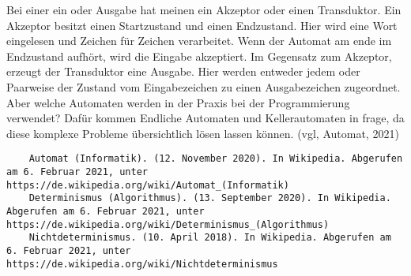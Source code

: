 Bei einer ein oder Ausgabe hat meinen ein Akzeptor oder einen Transduktor. Ein Akzeptor besitzt einen Startzustand und einen Endzustand. Hier wird eine Wort eingelesen und Zeichen für Zeichen verarbeitet. Wenn der Automat am ende im Endzustand aufhört, wird die Eingabe akzeptiert. Im Gegensatz zum Akzeptor, erzeugt der Transduktor eine Ausgabe. Hier werden entweder jedem oder Paarweise der Zustand vom Eingabezeichen zu einen Ausgabezeichen zugeordnet. 
Aber welche Automaten werden in der Praxis bei der Programmierung verwendet? Dafür kommen Endliche Automaten und Kellerautomaten in frage, da diese komplexe Probleme übersichtlich lösen lassen können. (vgl, Automat, 2021) 

\begin{lstlisting}
	Automat (Informatik). (12. November 2020). In Wikipedia. Abgerufen am 6. Februar 2021, unter https://de.wikipedia.org/wiki/Automat_(Informatik)
	Determinismus (Algorithmus). (13. September 2020). In Wikipedia. Abgerufen am 6. Februar 2021, unter https://de.wikipedia.org/wiki/Determinismus_(Algorithmus)
	Nichtdeterminismus. (10. April 2018). In Wikipedia. Abgerufen am 6. Februar 2021, unter https://de.wikipedia.org/wiki/Nichtdeterminismus
\end{lstlisting}